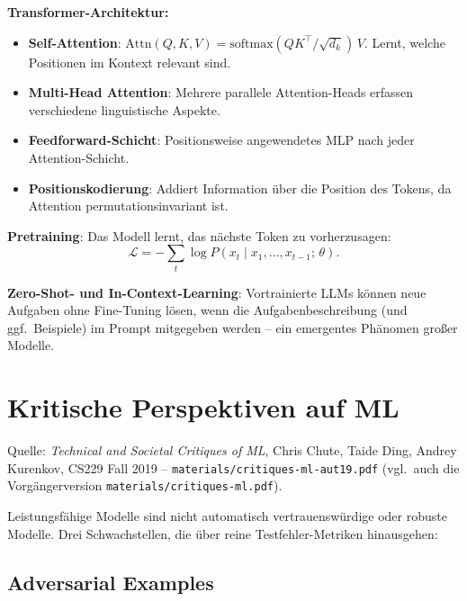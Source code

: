 \documentclass[11pt]{article}
\theoremstyle{csthm}
\theoremstyle{csdef}
\newcommand{\T}{^\top}
\begin{document}
\textbf{Transformer-Architektur:}
\begin{itemize}
  \item \textbf{Self-Attention}: $\mathrm{Attn}(Q,K,V) = \mathrm{softmax}(QK\T/\sqrt{d_k})\,V$.
        Lernt, welche Positionen im Kontext relevant sind.
  \item \textbf{Multi-Head Attention}: Mehrere parallele Attention-Heads
        erfassen verschiedene linguistische Aspekte.
  \item \textbf{Feedforward-Schicht}: Positionsweise angewendetes MLP nach
        jeder Attention-Schicht.
  \item \textbf{Positionskodierung}: Addiert Information über die Position
        des Tokens, da Attention permutationsinvariant ist.
\end{itemize}

\textbf{Pretraining}: Das Modell lernt, das nächste Token zu
vorherzusagen:
\[
  \mathcal{L} = -\sum_t \log P(x_t \mid x_1,\ldots,x_{t-1};\,\theta).
\]

\textbf{Zero-Shot- und In-Context-Learning}: Vortrainierte LLMs können neue
Aufgaben ohne Fine-Tuning lösen, wenn die Aufgabenbeschreibung (und ggf.\
Beispiele) im Prompt mitgegeben werden -- ein emergentes Phänomen großer
Modelle.

\section{Kritische Perspektiven auf ML}

\begin{tcolorbox}[srcstyle]
Quelle: \emph{Technical and Societal Critiques of ML}, Chris Chute, Taide
Ding, Andrey Kurenkov, CS229 Fall 2019 --
\texttt{materials/critiques-ml-aut19.pdf} (vgl.\ auch die Vorgängerversion
\texttt{materials/critiques-ml.pdf}).
\end{tcolorbox}

Leistungsfähige Modelle sind nicht automatisch vertrauenswürdige oder
robuste Modelle. Drei Schwachstellen, die über reine Testfehler-Metriken
hinausgehen:

\subsection{Adversarial Examples}
\end{document}
